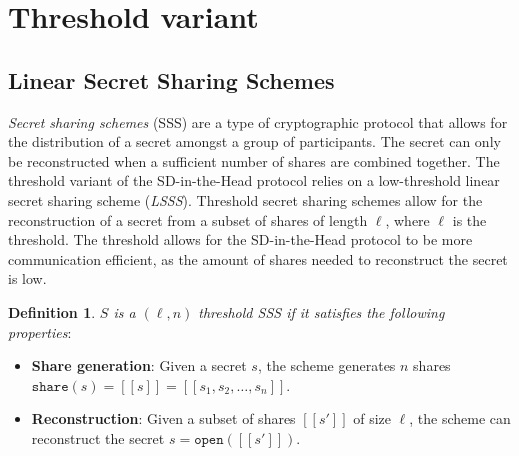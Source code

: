 \documentclass[twoside,11pt,openright]{report}
\theoremstyle{definition}
\newtheorem{definition}{Definition}[section]
\theoremstyle{plain}
\begin{document}

\section{Threshold variant}

\subsection{Linear Secret Sharing Schemes}
\label{sec:lsss}

\textit{Secret sharing schemes} (SSS) are a type of cryptographic protocol that allows for the distribution of a secret amongst a group of participants. The secret can only be reconstructed when a sufficient number of shares are combined together. The threshold variant of the SD-in-the-Head protocol relies on a low-threshold linear secret sharing scheme (\textit{LSSS}). Threshold secret sharing schemes allow for the reconstruction of a secret from a subset of shares of length $\ell$, where $\ell$ is the threshold. The threshold allows for the SD-in-the-Head protocol to be more communication efficient, as the amount of shares needed to reconstruct the secret is low.

\begin{definition}
  \label{def:sss}
  \textit{$S$ is a $(\ell,n)$ threshold SSS if it satisfies the following properties}:

  \begin{itemize}
    \item \textbf{Share generation}: Given a secret $s$, the scheme generates $n$ shares $\texttt{share}(s) = [[s]] = [[s_1, s_2, \dots, s_n]]$.
    \item \textbf{Reconstruction}: Given a subset of shares $[[s']]$ of size $\ell$, the scheme can reconstruct the secret $s = \texttt{open}([[s']])$.
  \end{itemize}

\end{definition}
\end{document}
